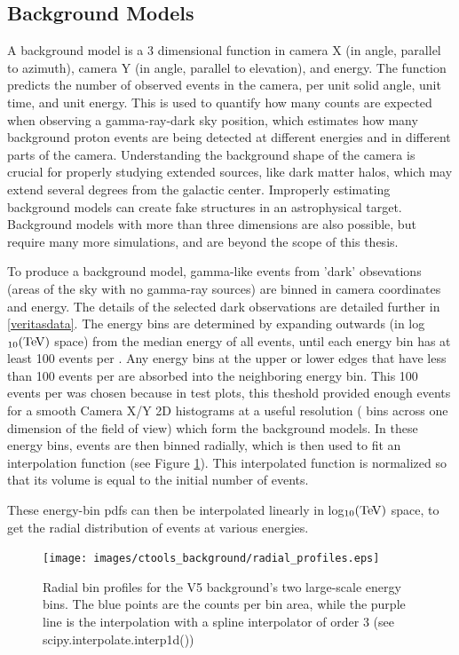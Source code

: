   \subsection{Background Models}\label{background_production}
    A background model is a 3 dimensional function in camera X (in angle, parallel to azimuth), camera Y (in angle, parallel to elevation), and energy.
    The function predicts the number of observed events in the camera, per unit solid angle, unit time, and unit energy.
    This is used to quantify how many counts are expected when observing a gamma-ray-dark sky position, which estimates how many background proton events are being detected at different energies and in different parts of the camera.
    Understanding the background shape of the camera is crucial for properly studying extended sources, like dark matter halos, which may extend several degrees from the galactic center.
    Improperly estimating background models can create fake structures in an astrophysical target.
    Background models with more than three dimensions are also possible, but require many more simulations, and are beyond the scope of this thesis.

    To produce a background model, gamma-like events from 'dark' obsevations (areas of the sky with no gamma-ray sources) are binned in camera coordinates and energy.
    The details of the selected dark observations are detailed further in \ref{veritasdata}.
    The energy bins are determined by expanding outwards (in log${}_{10}(\TeV{})$ space) from the median energy of all events, until each energy bin has at least 100 events per \degreesquared{}.
    Any energy bins at the upper or lower edges that have less than 100 events per \degreesquared{} are absorbed into the neighboring energy bin.
    This 100 events per \degreesquared{} was chosen because in test plots, this theshold provided enough events for a smooth Camera X/Y 2D histograms at a useful resolution ( bins across one dimension of the field of view) which form the background models.
    In these energy bins, events are then binned radially, which is then used to fit an interpolation function (see Figure \ref{fig:background_radial}).
    This interpolated function is normalized so that its volume is equal to the initial number of events. 

    These energy-bin pdfs can then be interpolated linearly in log${}_{10}(\TeV{})$ space, to get the radial distribution of events at various energies.

    \begin{figure}[ht]
      \centering
      \texttt{[image: images/ctools\_background/radial\_profiles.eps]}
      \caption[CTOOLS Radial Background Profiles]{
        Radial bin profiles for the V5 background's two large-scale energy bins.
        The blue points are the counts per bin area, while the purple line is the interpolation with a spline interpolator of order 3 (see scipy.interpolate.interp1d())
        }
      \label{fig:background_radial}
    \end{figure}


